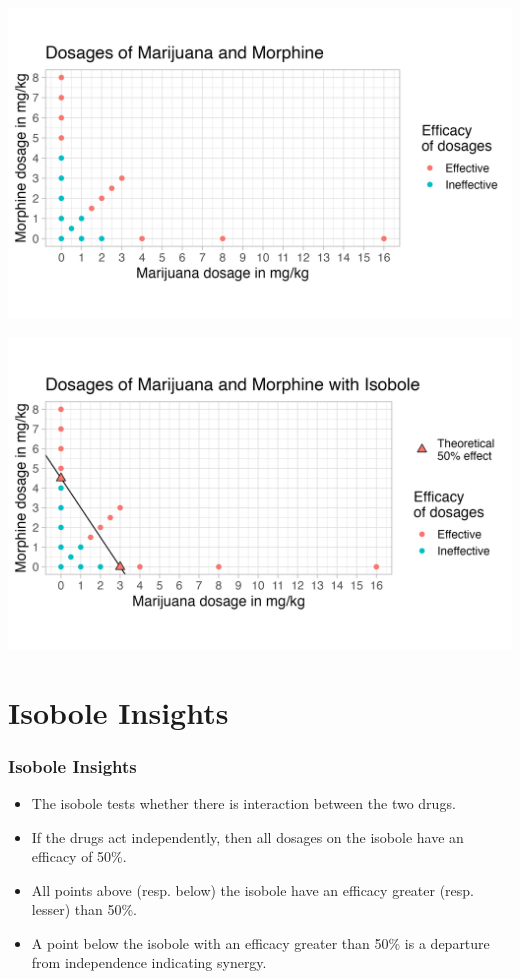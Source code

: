 \documentclass[14pt]{beamer}
\begin{document}
\begin{frame}
\begin{center}
\includegraphics[scale=0.6]{dosages_plot.png}
\end{center}
\end{frame}

\begin{frame}
\begin{center}
\includegraphics[scale=0.6]{isobole.png}
\end{center}
\end{frame}

\section{Isobole Insights}
\begin{frame}
\frametitle{Isobole Insights}
\begin{itemize}[label={$\blacktriangleright$}]
\item The isobole tests whether there is interaction between the two drugs.
\item If the drugs act independently, then all dosages on the isobole have an efficacy of 50\%.
\item All points above (resp. below) the isobole have an efficacy greater (resp. lesser) than 50\%.
\item A point below the isobole with an efficacy greater than 50\% is a departure from independence indicating synergy.
\end{itemize}
\end{frame}
\end{document}
